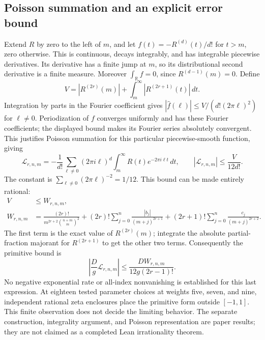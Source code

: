 \documentclass[11pt]{article}
\theoremstyle{remark}
\newcommand{\R}{\mathbb R}
\begin{document}
\subsection{Poisson summation and an explicit error bound}
Extend \(R\) by zero to the left of \(m\), and let
\(f(t)=-R^{(d)}(t)/d!\) for \(t>m\), zero otherwise.
This is continuous, decays integrably, and has integrable piecewise
derivatives. Its derivative has a finite jump at \(m\), so its
distributional second derivative is a finite measure. Moreover
\(\int_\R f=0\), since \(R^{(d-1)}(m)=0\).
Define
\[
 V=|R^{(2r)}(m)|+\int_m^\infty|R^{(2r+1)}(t)|\,dt.
\]
Integration by parts in the Fourier coefficient gives
\( |\widehat f(\ell)|\le V/(d!(2\pi\ell)^2)\) for \(\ell\ne0\).
Periodization of \(f\) converges uniformly and has these Fourier
coefficients; the displayed bound makes its Fourier series absolutely
convergent. This justifies Poisson summation for this particular
piecewise-smooth function, giving
\[
 \mathcal L_{r,n,m}
 =-\frac1{d!}\sum_{\ell\ne0}(2\pi i\ell)^d
       \int_m^\infty R(t)e^{-2\pi i\ell t}\,dt,
 \qquad
 |\mathcal L_{r,n,m}|\le\frac V{12d!}.
\]
The constant is \(\sum_{\ell\ne0}(2\pi\ell)^{-2}=1/12\).
This bound can be made entirely rational:
\begin{align*}
 V&\le W_{r,n,m},\\
 W_{r,n,m}&=
 \frac{(2r)!}{m^{2r+2}\binom{n+m}m^2}
 +(2r)!\sum_{j=0}^n\frac{|b_j|}{(m+j)^{2r+1}}
 +(2r+1)!\sum_{j=0}^n\frac{c_j}{(m+j)^{2r+2}}.
\end{align*}
The first term is the exact value of \(R^{(2r)}(m)\); integrate the
absolute partial-fraction majorant for \(R^{(2r+1)}\) to get the other
two terms. Consequently the primitive bound is
\[
 \left|\frac Dg\mathcal L_{r,n,m}\right|
       \le\frac{D W_{r,n,m}}{12g(2r-1)!}.
\]
No negative exponential rate or all-index nonvanishing is established
for this last expression. At eighteen tested parameter choices at
weights five, seven, and nine, independent rational zeta enclosures
place the primitive form outside \([-1,1]\). This finite observation
does not decide the limiting behavior. The separate construction,
integrality argument, and Poisson representation are paper results;
they are not claimed as a completed Lean irrationality theorem.
\end{document}
